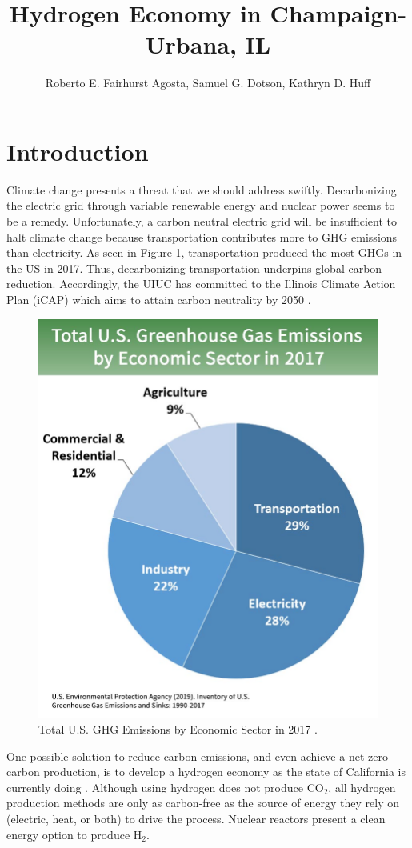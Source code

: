 \documentclass{anstrans}
\title{Hydrogen Economy in Champaign-Urbana, IL}
\author{Roberto E. Fairhurst Agosta, Samuel G. Dotson, Kathryn D. Huff}
\institute{
University of Illinois at Urbana-Champaign, Dept. of Nuclear, Plasma, and Radiological Engineering\\
ref3@illinois.edu
}
\begin{document}
\section{Introduction}

Climate change presents a threat that we should address swiftly. Decarbonizing the electric grid through variable renewable energy and nuclear power seems to be a remedy. Unfortunately, a carbon neutral electric grid will be insufficient to halt climate change because transportation contributes more to \gls{GHG} emissions than electricity. As seen in Figure \ref{fig:ghg}, transportation produced the most \glspl{GHG} in the US in 2017. Thus, decarbonizing transportation underpins global carbon reduction. Accordingly, the \gls{UIUC} has committed to the Illinois Climate Action Plan (iCAP) which aims to attain carbon neutrality by 2050 \cite{noauthor_illlinois_2015}.

\begin{figure}[H]
	\centering
	\includegraphics[width=0.6\linewidth]{figures/total-ghg-2019-caption.jpg}
	\hfill
	\caption{Total U.S. GHG Emissions by Economic Sector in 2017 \cite{us_epa_sources_2020}.}
	\label{fig:ghg}
\end{figure}

One possible solution to reduce carbon emissions, and even achieve a net zero carbon production, is to develop a hydrogen economy as the state of California is currently doing \cite{brown_economic_2013}. 
Although using hydrogen does not produce CO$_2$, all hydrogen production methods are only as carbon-free as the source of energy they rely on (electric, heat, or both) to drive the process.
Nuclear reactors present a clean energy option to produce H$_2$.
\end{document}
